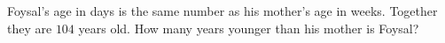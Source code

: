 Foysal's age in days is the same number as his mother's age in weeks. Together they are $104$ years old. How many years younger than his mother is Foysal?
